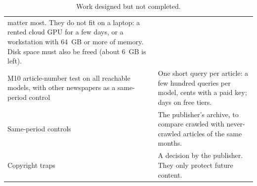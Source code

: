 \documentclass[10pt,a4paper]{article}
\begin{document}
\begin{table}[h]
\begin{tabularx}{\linewidth}{>{\raggedright\arraybackslash}p{4.4cm}>{\raggedright\arraybackslash}X}
matter most. They do not fit on a laptop: a rented cloud GPU for a few days, or a workstation with 64~GB or more of
memory. Disk space must also be freed (about 6~GB is left).\\
M10 article-number test on all reachable models, with other newspapers as a same-period control & One short
query per article: a few hundred queries per model, cents with a paid key; days on free tiers.\\
Same-period controls & The publisher's archive, to compare crawled with never-crawled articles of the same months.\\
Copyright traps & A decision by the publisher. They only protect future content.\\
\bottomrule
\end{tabularx}
\caption{Work designed but not completed.}\label{tab:status}
\end{table}

\end{document}
